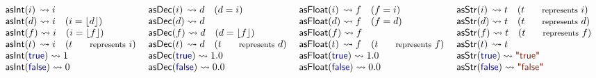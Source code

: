 \documentclass[preprint]{sigplanconf}
\newcommand{\kvd}[1]{\textnormal{\textcolor{kvdclr}{\sffamily #1}}}
\newcommand{\str}[1]{\textnormal{\textcolor{strclr}{\sffamily "#1"}}}
\newcommand{\ident}[1]{\textnormal{\sffamily #1}}
\newcommand{\reduce}{\rightsquigarrow}
\begin{document}
\begin{figure}
\begin{equation*}
\begin{array}{l}
 \ident{asInt}(i) \,\reduce i\\
 \ident{asInt}(d) \reduce i\quad(i = \lfloor d \rfloor)\\
 \ident{asInt}(f) \reduce i\quad(i = \lfloor f \rfloor) \\
 \ident{asInt}(t) \,\reduce i\quad(t~\text{\small represents}~i) \\
 \ident{asInt}(\kvd{true}) \reduce 1\\
 \ident{asInt}(\kvd{false}) \reduce 0\\
\end{array}
\;
\begin{array}{l}
 \ident{asDec}(i) \,\reduce d\quad(d = i)\\
 \ident{asDec}(d) \reduce d\\
 \ident{asDec}(f) \reduce d\quad(d = \lfloor f \rfloor) \\
 \ident{asDec}(t) \,\reduce d\quad(t~\text{\small represents}~d) \\
 \ident{asDec}(\kvd{true}) \reduce 1.0\\
 \ident{asDec}(\kvd{false}) \reduce 0.0\\
\end{array}
\;
\begin{array}{l}
 \ident{asFloat}(i) \,\reduce f\quad(f = i)\\
 \ident{asFloat}(d) \reduce f\quad(f = d)\\
 \ident{asFloat}(f) \reduce f\\
 \ident{asFloat}(t) \,\reduce f\quad(t~\text{\small represents}~f) \\
 \ident{asFloat}(\kvd{true}) \reduce 1.0\\
 \ident{asFloat}(\kvd{false}) \reduce 0.0\\
\end{array}
\;
\begin{array}{l}
 \ident{asStr}(i) \,\reduce t\quad(t~\text{\small represents}~i)\\
 \ident{asStr}(d) \reduce t\quad(t~\text{\small represents}~d)\\
 \ident{asStr}(f) \reduce t\quad(t~\text{\small represents}~f)\\
 \ident{asStr}(t) \,\reduce t\\
 \ident{asStr}(\kvd{true}) \reduce \str{true}\\
 \ident{asStr}(\kvd{false}) \reduce \str{false}\\

\end{array}
\end{equation*}
\end{figure}
\end{document}
